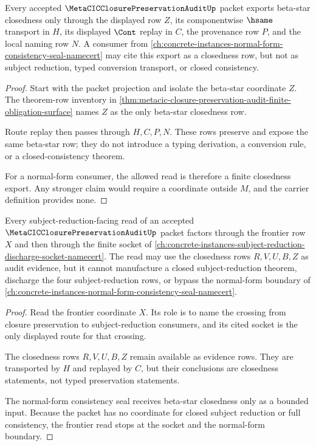 \begin{theorem}
\label{thm:metacic-closure-preservation-audit-beta-star-closedness-export}
Every accepted $\MetaCICClosurePreservationAuditUp$ packet exports beta-star closedness only through the displayed row $Z$, its componentwise $\hsame$ transport in $H$, its displayed $\Cont$ replay in $C$, the provenance row $P$, and the local naming row $N$. A consumer from \autoref{ch:concrete-instances-normal-form-consistency-seal-namecert} may cite this export as a closedness row, but not as subject reduction, typed conversion transport, or closed consistency.
\end{theorem}
\begin{proof}
Start with the packet projection and isolate the beta-star coordinate $Z$. The theorem-row inventory in \autoref{thm:metacic-closure-preservation-audit-finite-obligation-surface} names $Z$ as the only beta-star closedness row.

Route replay then passes through $H,C,P,N$. These rows preserve and expose the same beta-star row; they do not introduce a typing derivation, a conversion rule, or a closed-consistency theorem.

For a normal-form consumer, the allowed read is therefore a finite closedness export. Any stronger claim would require a coordinate outside $M$, and the carrier definition provides none.
\end{proof}

\begin{theorem}
\label{thm:metacic-closure-preservation-audit-sr-frontier-separation}
Every subject-reduction-facing read of an accepted $\MetaCICClosurePreservationAuditUp$ packet factors through the frontier row $X$ and then through the finite socket of \autoref{ch:concrete-instances-subject-reduction-discharge-socket-namecert}. The read may use the closedness rows $R,V,U,B,Z$ as audit evidence, but it cannot manufacture a closed subject-reduction theorem, discharge the four subject-reduction rows, or bypass the normal-form boundary of \autoref{ch:concrete-instances-normal-form-consistency-seal-namecert}.
\end{theorem}
\begin{proof}
Read the frontier coordinate $X$. Its role is to name the crossing from closure preservation to subject-reduction consumers, and its cited socket is the only displayed route for that crossing.

The closedness rows $R,V,U,B,Z$ remain available as evidence rows. They are transported by $H$ and replayed by $C$, but their conclusions are closedness statements, not typed preservation statements.

The normal-form consistency seal receives beta-star closedness only as a bounded input. Because the packet has no coordinate for closed subject reduction or full consistency, the frontier read stops at the socket and the normal-form boundary.
\end{proof}

